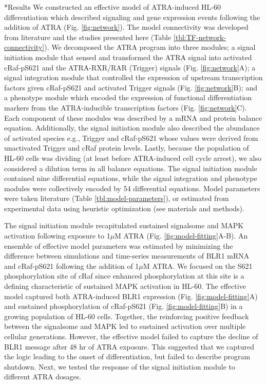 \documentclass[12pt]{article}
\makeatletter
\renewcommand\section{\@startsection
	{subsection}{2}{0mm}
	{-0.2in}
	{0.05\baselineskip}
	{\normalfont\large\bfseries}}
\makeatother
\begin{document}
\section*{Results}
We constructed an effective model of ATRA-induced HL-60 differentiation which described signaling and gene expression events following the addition of ATRA (Fig. \ref{fig:network}).
The model connectivity was developed from literature and the studies presented here (Table \ref{tbl:TF-network-connectivity}).
We decomposed the ATRA program into three modules;
a signal initiation module that sensed and transformed the ATRA signal into activated cRaf-pS621 and the ATRA-RXR/RAR (Trigger) signals (Fig. \ref{fig:network}A);
a signal integration module that controlled the expression of upstream transcription factors given cRaf-pS621 and activated Trigger signals (Fig. \ref{fig:network}B); and
a phenotype module which encoded the expression of functional differentiation markers from the ATRA-inducible transcription factors (Fig. \ref{fig:network}C).
Each component of these modules was described by a mRNA and protein balance equation.
Additionally, the signal initiation module also described the abundance of activated species e.g., Trigger and cRaf-pS621 whose values were derived from
unactivated Trigger and cRaf protein levels.
Lastly, because the population of HL-60 cells was dividing (at least before ATRA-induced cell cycle arrest), we also considered a dilution term in all balance equations.
The signal initiation module contained nine differential equations, while the signal integration and phenotype modules were collectively encoded by 54 differential equations.
Model parameters were taken literature (Table \ref{tbl:model-parameters}), or estimated from experimental data using heuristic optimization (see materials and methods).

The signal initiation module recapitulated sustained signalsome and MAPK activation following exposure to 1$\mu$M ATRA (Fig. \ref{fig:model-fitting}A-B).
An ensemble of effective model parameters was estimated by minimizing the difference between simulations and time-series measurements of BLR1 mRNA and
cRaf-pS621 following the addition of 1$\mu$M ATRA. We focused on the S621 phosphorylation site of cRaf since enhanced phosphorylation at this site is a defining
characteristic of sustained MAPK activation in HL-60. The effective model captured both ATRA-induced BLR1 expression (Fig. \ref{fig:model-fitting}A)
and sustained phosphorylation of cRaf-pS621 (Fig. \ref{fig:model-fitting}B) in a growing population of HL-60 cells.
Together, the reinforcing positive feedback between the signalsome and MAPK led to sustained activation over multiple cellular generations.
However, the effective model failed to capture the decline of BLR1 message after 48 hr of ATRA exposure.
This suggested that we captured the logic leading to the onset of differentiation, but failed to describe program shutdown.
Next, we tested the response of the signal initiation module to different ATRA dosages.
\end{document}
